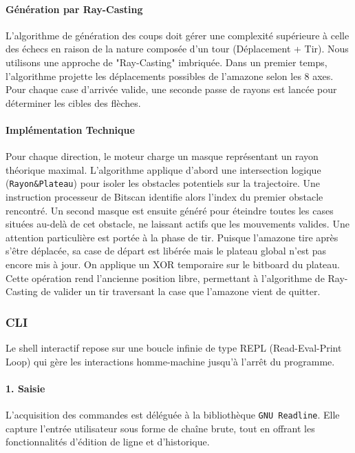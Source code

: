 \documentclass[11pt,a4paper,titlepage,oneside]{article}
\begin{document}
        \paragraph{Génération par Ray-Casting}
        L'algorithme de génération des coups doit gérer une complexité supérieure à celle des échecs en raison de la nature composée d'un tour (Déplacement + Tir). Nous utilisons une approche de "Ray-Casting" imbriquée.
        Dans un premier temps, l'algorithme projette les déplacements possibles de l'amazone selon les 8 axes. Pour chaque case d'arrivée valide, une seconde passe de rayons est lancée pour déterminer les cibles des flèches. 

        \paragraph{Implémentation Technique}
        Pour chaque direction, le moteur charge un masque représentant un rayon théorique maximal. L'algorithme applique d'abord une intersection logique (\texttt{Rayon\&Plateau}) pour isoler les obstacles potentiels sur la trajectoire.
        Une instruction processeur de Bitscan identifie alors l'index du premier obstacle rencontré. Un second masque est ensuite généré pour éteindre toutes les cases situées au-delà de cet obstacle, ne laissant actifs que les mouvements valides.
        Une attention particulière est portée à la phase de tir. Puisque l'amazone tire après s'être déplacée, sa case de départ est libérée mais le plateau global n'est pas encore mis à jour. On applique un XOR temporaire sur le bitboard du plateau. Cette opération rend l'ancienne position libre, permettant à l'algorithme de Ray-Casting de valider un tir traversant la case que l'amazone vient de quitter.


\subsubsection{CLI}

    Le shell interactif repose sur une boucle infinie de type REPL (Read-Eval-Print Loop) qui gère les interactions homme-machine jusqu'à l'arrêt du programme.

    \paragraph{1. Saisie } L'acquisition des commandes est déléguée à la bibliothèque \texttt{GNU Readline}. Elle capture l'entrée utilisateur sous forme de chaîne brute, tout en offrant les fonctionnalités d'édition de ligne et d'historique.
\end{document}
